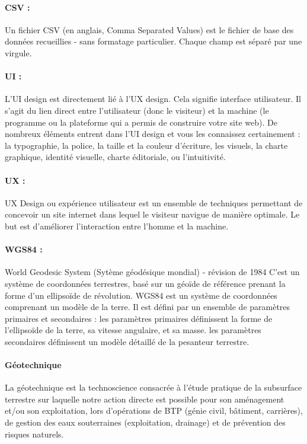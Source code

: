 \paragraph{CSV :}
Un fichier CSV (en anglais, Comma Separated Values) est le fichier de 
base des données recueillies - sans formatage particulier. Chaque 
champ est séparé par une virgule.

\paragraph{UI :}
L’UI design est directement lié à l’UX design. Cela signifie interface 
utilisateur. Il s’agit du lien direct entre l’utilisateur (donc le visiteur) 
et la machine (le programme ou la plateforme qui a permis de construire 
votre site web). De nombreux éléments entrent dans l’UI design et vous 
les connaissez certainement : la typographie, la police, la taille et la 
couleur d’écriture, les visuels, la charte graphique, identité visuelle, 
charte éditoriale, ou l’intuitivité.

\paragraph{UX :}
UX Design ou expérience utilisateur est un ensemble de techniques 
permettant de concevoir un site internet dans lequel le visiteur navigue 
de manière optimale. Le but est d’améliorer l’interaction entre l’homme 
et la machine. 

\paragraph{WGS84 :}
World Geodesic System (Sytème géodésique mondial) - révision de 1984
C'est un système de coordonnées terrestres, basé sur un géoïde de référence 
prenant la forme d'un ellipsoïde de révolution.
WGS84 est un système de coordonnées comprenant un modèle de la terre. Il est 
défini par un ensemble de paramètres primaires et secondaires :
les paramètres primaires définissent la forme de l'ellipsoïde de la terre, sa vitesse angulaire, et sa masse.
les paramètres secondaires définissent un modèle détaillé de la pesanteur terrestre.

\paragraph{Géotechnique}
La géotechnique est la technoscience consacrée à l’étude pratique de la 
subsurface terrestre sur laquelle notre action directe est possible pour 
son aménagement et/ou son exploitation, lors d’opérations de BTP (génie 
civil, bâtiment, carrières), de gestion des eaux souterraines (exploitation, 
drainage) et de prévention des risques naturels.

